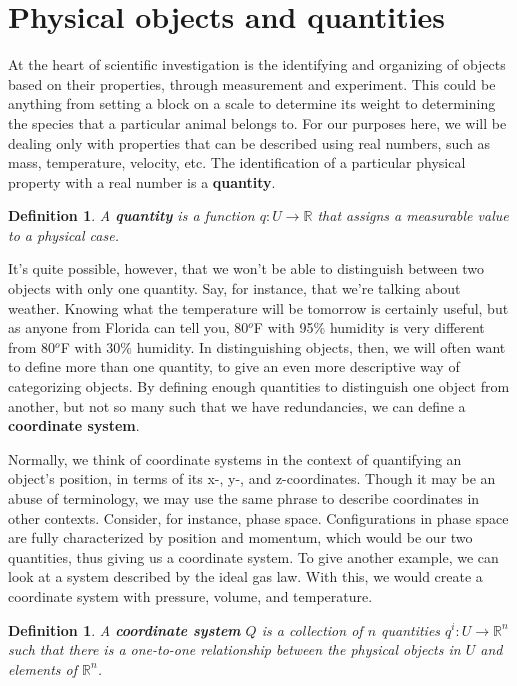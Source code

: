 \documentclass{book}
\newtheorem{defn}[equation]{Definition}
\begin{document}
\section{Physical objects and quantities}

At the heart of scientific investigation is the identifying and organizing of objects based on their properties, through measurement and experiment. This could be anything from setting a block on a scale to determine its weight to determining the species that a particular animal belongs to. For our purposes here, we will be dealing only with properties that can be described using real numbers, such as mass, temperature, velocity, etc. The identification of a particular physical property with a real number is a \textbf{quantity}.

\begin{defn}
	A \textbf{quantity} is a function $q : U \to \mathbb{R}$ that assigns a measurable value to a physical case.
\end{defn}



It's quite possible, however, that we won't be able to distinguish between two objects with only one quantity. Say, for instance, that we're talking about weather. Knowing what the temperature will be tomorrow is certainly useful, but as anyone from Florida can tell you, 80$^o$F with 95$\%$ humidity is very different from 80$^o$F with 30$\%$ humidity. In distinguishing objects, then, we will often want to define more than one quantity, to give an even more descriptive way of categorizing objects. By defining enough quantities to distinguish one object from another, but not so many such that we have redundancies, we can define a \textbf{coordinate system}.


Normally, we think of coordinate systems in the context of quantifying an object's position, in terms of its x-, y-, and z-coordinates. Though it may be an abuse of terminology, we may use the same phrase to describe coordinates in other contexts. Consider, for instance, phase space. Configurations in phase space are fully characterized by position and momentum, which would be our two quantities, thus giving us a coordinate system. To give another example, we can look at a system described by the ideal gas law. With this, we would create a coordinate system with pressure, volume, and temperature. 

\begin{defn}
	A \textbf{coordinate system} $Q$ is a collection of $n$ quantities $q^i : U \to \mathbb{R}^n$ such that there is a one-to-one relationship between the physical objects in $U$ and elements of $\mathbb{R}^n$.
\end{defn}
\end{document}
